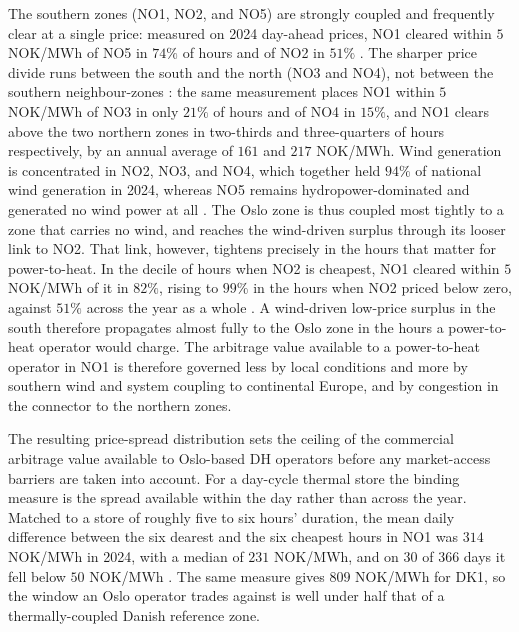 The southern zones (NO1, NO2, and NO5) are strongly coupled and frequently clear at a single price: measured on 2024 day-ahead prices, NO1 cleared within $5$ NOK/MWh of NO5 in $74\%$ of hours and of NO2 in $51\%$ \cite{nord_pool_nord_nodate}. The sharper price divide runs between the south and the north (NO3 and NO4), not between the southern neighbour-zones \cite{iea_-_international_energy_agency_norway_2022}: the same measurement places NO1 within $5$ NOK/MWh of NO3 in only $21\%$ of hours and of NO4 in $15\%$, and NO1 clears above the two northern zones in two-thirds and three-quarters of hours respectively, by an annual average of $161$ and $217$ NOK/MWh. Wind generation is concentrated in NO2, NO3, and NO4, which together held $94\%$ of national wind generation in 2024, whereas NO5 remains hydropower-dominated and generated no wind power at all \cite{statistisk_sentralbyra_statbank_nodate}. The Oslo zone is thus coupled most tightly to a zone that carries no wind, and reaches the wind-driven surplus through its looser link to NO2. That link, however, tightens precisely in the hours that matter for power-to-heat. In the decile of hours when NO2 is cheapest, NO1 cleared within $5$ NOK/MWh of it in $82\%$, rising to $99\%$ in the hours when NO2 priced below zero, against $51\%$ across the year as a whole \cite{nord_pool_nord_nodate}. A wind-driven low-price surplus in the south therefore propagates almost fully to the Oslo zone in the hours a power-to-heat operator would charge. The arbitrage value available to a power-to-heat operator in NO1 is therefore governed less by local conditions and more by southern wind and system coupling to continental Europe, and by congestion in the connector to the northern zones. 

The resulting price-spread distribution sets the ceiling of the commercial arbitrage value available to Oslo-based DH operators before any market-access barriers are taken into account. For a day-cycle thermal store the binding measure is the spread available within the day rather than across the year. Matched to a store of roughly five to six hours' duration, the mean daily difference between the six dearest and the six cheapest hours in NO1 was $314$ NOK/MWh in 2024, with a median of $231$ NOK/MWh, and on $30$ of $366$ days it fell below $50$ NOK/MWh \cite{nord_pool_nord_nodate}. The same measure gives $809$ NOK/MWh for DK1, so the window an Oslo operator trades against is well under half that of a thermally-coupled Danish reference zone.

